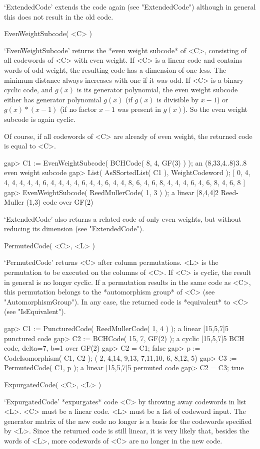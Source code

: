 `ExtendedCode' extends the  code  again (see "ExtendedCode")  although in
general this does not result in the old code.

\>EvenWeightSubcode( <C> )

`EvenWeightSubcode' returns the *even  weight subcode* of <C>, consisting
of all  codewords of <C> with even  weight. If <C>  is  a linear code and
contains words of  odd weight, the resulting code  has a dimension of one
less.  The minimum distance  always increases with one  if it was odd. If
<C> is a binary cyclic code, and $g(x)$  is its generator polynomial, the
even weight subcode either has  generator polynomial $g(x)$ (if $g(x)$ is
divisible by  $x-1$) or $g(x)*(x-1)$ (if no  factor $x-1$ was present in
$g(x)$). So the even weight subcode is again cyclic.

Of course,  if all codewords  of  <C>  are already   of even weight,  the
returned code is equal to <C>.

\beginexample
gap> C1 := EvenWeightSubcode( BCHCode( 8, 4, GF(3) ) );
an (8,33,4..8)3..8 even weight subcode
gap> List( AsSSortedList( C1 ), WeightCodeword );
[ 0, 4, 4, 4, 4, 4, 4, 6, 4, 4, 4, 4, 6, 4, 4, 6, 4, 4, 8, 6, 4, 6, 8, 4, 4, 
  4, 6, 4, 6, 8, 4, 6, 8 ]
gap> EvenWeightSubcode( ReedMullerCode( 1, 3 ) );
a linear [8,4,4]2 Reed-Muller (1,3) code over GF(2) 
\endexample

`ExtendedCode' also  returns  a related  code of  only even  weights, but
without reducing its dimension (see "ExtendedCode").

\>PermutedCode( <C>, <L> )

`PermutedCode'     returns <C> after     column  permutations. <L> is the
permutation to be executed  on the columns of  <C>. If <C> is cyclic, the
result  in general is  no longer cyclic. If  a permutation results in the
same code as <C>, this permutation belongs to the *automorphism group* of
<C>  (see "AutomorphismGroup"). In   any   case,  the returned code    is
*equivalent* to <C> (see "IsEquivalent").

\beginexample
gap> C1 := PuncturedCode( ReedMullerCode( 1, 4 ) );
a linear [15,5,7]5 punctured code
gap> C2 := BCHCode( 15, 7, GF(2) );
a cyclic [15,5,7]5 BCH code, delta=7, b=1 over GF(2)
gap> C2 = C1;
false
gap> p := CodeIsomorphism( C1, C2 );
( 2, 4,14, 9,13, 7,11,10, 6, 8,12, 5)
gap> C3 := PermutedCode( C1, p );
a linear [15,5,7]5 permuted code
gap> C2 = C3;
true 
\endexample

\>ExpurgatedCode( <C>, <L> )

`ExpurgatedCode' *expurgates* code <C> by throwing away codewords in list
<L>.  <C> must be    a linear code. <L>   must   be a list  of   codeword
input. The generator matrix of the new code no  longer is a basis for the
codewords specified by <L>.  Since the  returned code is still linear, it
is very likely that, besides the words of <L>, more  codewords of <C> are
no longer in the new code.

